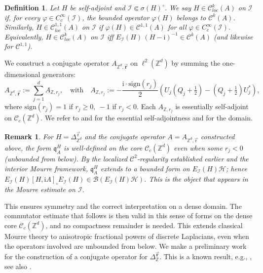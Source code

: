 \documentclass[10pt]{amsart} %
\newcommand{\Z}{{\mathbb{Z}}}
\newcommand{\1}{{\mathbb{I}}}
\newcommand{\Bc}{\mathcal{B}}
\newcommand{\Cc}{\mathcal{C}}
\newcommand{\Hc}{\mathcal{H}}
\newcommand{\Ic}{\mathcal{I}}
\numberwithin{equation}{section}
\newtheorem{remark}[theorem]{Remark}%
\newtheorem{definition}[theorem]{Definition}%
\begin{document}
\begin{definition}
Let $H$ be self-adjoint and \(\Ic\Subset\sigma(H)^\circ\).
We say \(H\in\mathcal C^k_{loc}(A)\) on \(\Ic\) if, for every \(\varphi\in C_c^\infty(\Ic)\),
the bounded operator \(\varphi(H)\) belongs to \(\mathcal C^k(A)\).
Similarly, \(H\in\mathcal C^{1,1}_{loc}(A)\) on \(\Ic\) if \(\varphi(H)\in\mathcal C^{1,1}(A)\) for all
\(\varphi\in C_c^\infty(\Ic)\).
Equivalently, \(H\in\mathcal C^k_{loc}(A)\) on \(\Ic\) iff \(E_\Ic(H)\,(H-\mathrm i)^{-1}\in\mathcal C^k(A)\)
(and likewise for \(\mathcal C^{1,1}\)).
\end{definition}
We construct a conjugate operator \(A_{\mathbb{Z}^d,\vec{\mathbf{r}}}\) on \( \ell^2(\mathbb{Z}^d) \) by summing the one-dimensional generators:
\begin{equation} \label{bb}
A_{\mathbb{Z}^d,\vec{\mathbf{r}}} := \sum_{j=1}^d A_{\mathbb{Z},r_j},
\quad \text{with} \quad
A_{\mathbb{Z},r_j} := -\frac{\mathrm{i} \cdot \mathrm{sign}(r_j)}{2} \left( U_j(Q_j + \tfrac{1}{2}) - (Q_j + \tfrac{1}{2}) U_j^* \right),
\end{equation}
where $\mathrm{sign}(r_j)=1$ if $r_j\geq 0,\ -1$ if $r_j<0$. Each $A_{\mathbb{Z},r_j}$ is essentially self-adjoint on \(\mathcal{C}_c(\mathbb{Z}^d)\). We refer to \cite{GG} and \cite[Lemma 5.7]{Mic} for the essential self-adjointness and \cite[Lemma 3.1]{GG} for the domain.
\begin{remark}
For $H=\Delta_{\Z^d}^{\vec{\mathrm r}}$ and the conjugate operator $A=A_{\mathbb{Z}^d,\vec{\mathrm r}}$ constructed above,
the form $\mathfrak q_A^H$ is well-defined on the core $\Cc_c(\Z^d)$ even when some $r_j<0$ (unbounded from below).
By the localized $\Cc^2$-regularity established earlier and the interior Mourre framework,
$\mathfrak q_A^H$ extends to a bounded form on $E_\Ic(H)\Hc$; hence $E_\Ic(H)[H,\mathrm i A]_\circ E_\Ic(H)\in\Bc(E_\Ic(H)\Hc)$.
This is the object that appears in the Mourre estimate on $\Ic$.
\end{remark}
This ensures symmetry and the correct interpretation on a dense domain.
 The commutator estimate that follows is then valid in this sense of forms on the dense core \( \mathcal{C}_c(\mathbb{Z}^d) \), and no compactness remainder is needed. This extends classical Mourre theory to anisotropic fractional powers of discrete Laplacians, even when the operators involved are unbounded from below.  We make a preliminary work for the construction of a conjugate operator for $\Delta_\Z^{\vec{\mathbf{r}}}$. This is a known result, e.g., \cite{AF}, see also \cite{GG, Mic}.
\end{document}
